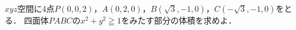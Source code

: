 \documentclass[../../main.tex]{subfiles}
\begin{document}
$xyz$空間に4点$P(0,0,2)$，$A(0,2,0)$，$B(\sqrt{3},-1,0)$，$C(-\sqrt{3},-1,0)$をとる．
四面体$PABC$の$x^2+y^2\geqq1$をみたす部分の体積を求めよ．
\end{document}
